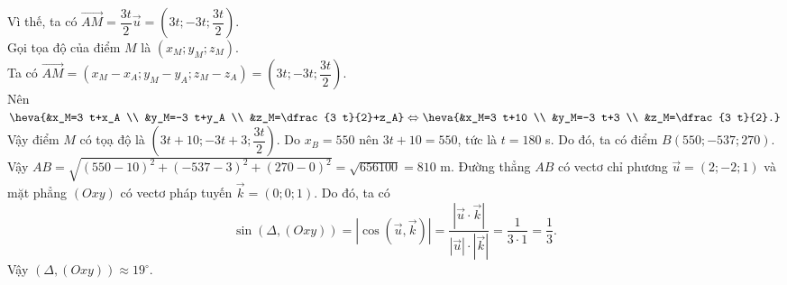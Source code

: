 \begin{ex}
{\begin{itemchoice}
	Vì thế, ta có $\overrightarrow{A M}=\dfrac{3 t}{2} \overrightarrow{u}=\left(3 t ;-3 t ; \dfrac{3 t}{2}\right)$.\\
	Gọi tọa độ của điểm $M$ là $\left(x_M ; y_M ; z_M\right)$.\\
	Ta có $\overrightarrow{A M}=\left(x_M-x_A ; y_M-y_A ; z_M-z_A\right)=\left(3 t ;-3 t ; \dfrac{3 t}{2}\right)$.\\
	Nên $\heva{&x_M=3 t+x_A \\ &y_M=-3 t+y_A \\ &z_M=\dfrac{3 t}{2}+z_A}\Leftrightarrow\heva{&x_M=3 t+10 \\ &y_M=-3 t+3 \\ &z_M=\dfrac{3 t}{2}.}$\\
	Vậy điểm $M$ có tọạ độ là $\left(3 t+10 ;-3 t+3 ;\dfrac{3 t}{2}\right)$.
	\itemch Do $x_B=550$ nên $3 t+10=550$, tức là $t=180$ s. Do đó, ta có điểm $B(550 ;-537 ; 270)$. \\
	Vậy $A B=\sqrt{(550-10)^2+(-537-3)^2+(270-0)^2}=\sqrt{656100}=810$ m.
	\itemch Đường thẳng $AB$ có vectơ chỉ phương $\overrightarrow{u}=(2 ;-2 ; 1)$ và mặt phẳng $(Oxy)$ có vectơ pháp tuyến $\overrightarrow{k}=(0 ; 0 ; 1)$. Do đó, ta có
	$$
	\sin (\Delta,(O x y))=|\cos (\overrightarrow{u},\overrightarrow{k})|=\dfrac{\left|\overrightarrow{u} \cdot \overrightarrow{k}\right|}{|\overrightarrow{u}| \cdot|\overrightarrow{k}|}=\dfrac{1}{3 \cdot 1}=\dfrac{1}{3}.$$
	Vậy $(\Delta,(O x y)) \approx 19^{\circ}$.
	\end{itemchoice}
	}
\end{ex}
